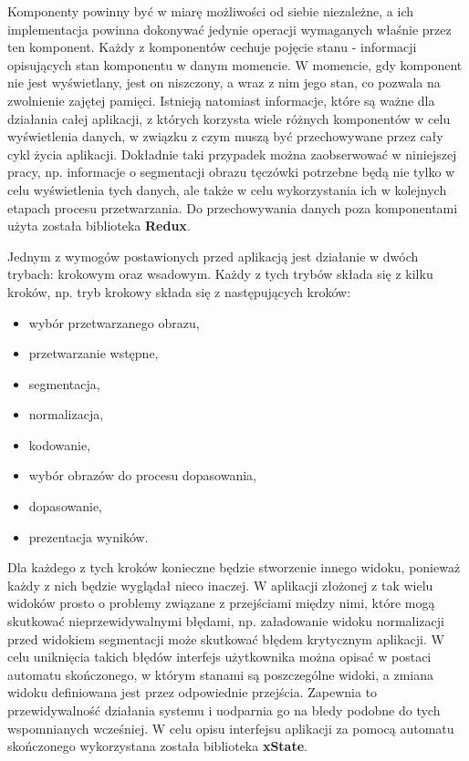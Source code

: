 Komponenty powinny by\'c w miarę możliwości od siebie niezależne, a ich implementacja powinna
dokonywa\'c jedynie operacji wymaganych właśnie przez ten komponent. Każdy z komponentów cechuje
pojęcie stanu - informacji opisujących stan komponentu w danym momencie. W momencie, gdy komponent
nie jest wyświetlany, jest on niszczony, a wraz z nim jego stan, co pozwala na zwolnienie
zajętej pamięci. Istnieją natomiast informacje, które są ważne dla działania całej aplikacji, z których
korzysta wiele różnych komponentów w celu wyświetlenia danych, w związku z czym muszą by\'c przechowywane
przez cały cykl życia aplikacji. Dokładnie taki przypadek można zaobserwowa\'c w niniejszej pracy, np.
informacje o segmentacji obrazu tęczówki potrzebne będą nie tylko w celu wyświetlenia tych danych,
ale także w celu wykorzystania ich w kolejnych etapach procesu przetwarzania. Do przechowywania danych
poza komponentami użyta została biblioteka \textbf{Redux}.

Jednym z wymogów postawionych przed aplikacją jest działanie w dwóch trybach: krokowym oraz wsadowym.
Każdy z tych trybów składa się z kilku kroków, np. tryb krokowy składa się z następujących kroków:

\begin{itemize}
  \item wybór przetwarzanego obrazu,
  \item przetwarzanie wstępne,
  \item segmentacja,
  \item normalizacja,
  \item kodowanie,
  \item wybór obrazów do procesu dopasowania,
  \item dopasowanie,
  \item prezentacja wyników.
\end{itemize}

Dla każdego z tych kroków konieczne będzie stworzenie innego widoku, ponieważ każdy z nich będzie wyglądał
nieco inaczej. W aplikacji złożonej z tak wielu widoków prosto o problemy związane z przejściami między nimi,
które mogą skutkowa\'c nieprzewidywalnymi błędami, np. załadowanie widoku normalizacji przed widokiem segmentacji
może skutkowa\'c błędem krytycznym aplikacji. W celu uniknięcia takich błędów interfejs użytkownika można
opisa\'c w postaci automatu skończonego, w którym stanami są poszczególne widoki, a zmiana widoku definiowana
jest przez odpowiednie przejścia. Zapewnia to przewidywalnoś\'c działania systemu i uodparnia go na
błedy podobne do tych wspomnianych wcześniej. W celu opisu interfejsu aplikacji za pomocą automatu skończonego
wykorzystana została biblioteka \textbf{xState}.\newline

